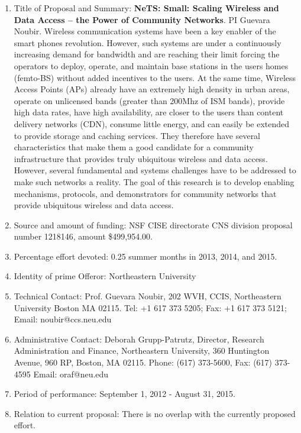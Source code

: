 \begin{enumerate}
\item Title of Proposal and Summary: {\bf NeTS: Small: Scaling Wireless
  and Data Access – the Power of Community Networks}.  PI Guevara
  Noubir.  Wireless communication systems have been a key enabler of
  the smart phones revolution. However, such systems are under a
  continuously increasing demand for bandwidth and are reaching their
  limit forcing the operators to deploy, operate, and maintain base
  stations in the users homes (femto-BS) without added incentives to
  the users. At the same time, Wireless Access Points (APs) already
  have an extremely high density in urban areas, operate on unlicensed
  bands (greater than 200Mhz of ISM bands), provide high data rates,
  have high availability, are closer to the users than content
  delivery networks (CDN), consume little energy, and can easily be
  extended to provide storage and caching services. They therefore
  have several characteristics that make them a good candidate for a
  community infrastructure that provides truly ubiquitous wireless and
  data access. However, several fundamental and systems challenges
  have to be addressed to make such networks a reality.  The goal of
  this research is to develop enabling mechanisms, protocols, and
  demonstrators for community networks that provide ubiquitous
  wireless and data access.
\item Source and amount of funding: NSF CISE directorate CNS division
  proposal number 1218146, amount \$499,954.00.
\item Percentage effort devoted: 0.25 summer months in 2013, 2014, and 2015.
\item Identity of prime Offeror: Northeastern University
\item Technical Contact: Prof. Guevara Noubir,  202 WVH, CCIS, Northeastern University
Boston MA 02115.  Tel: +1 617 373 5205;  Fax: +1 617 373 5121;  Email: noubir@ccs.neu.edu
\item Administrative Contact: Deborah Grupp-Patrutz, Director,
  Research Administration and Finance, Northeastern University, 360
  Huntington Avenue, 960 RP, Boston, MA 02115. Phone: (617) 373-5600,
  Fax: (617) 373-4595 Email: oraf@neu.edu
\item  Period of performance: September 1, 2012 - August 31, 2015.
\item Relation to current proposal: There is no overlap with the currently proposed effort.
\end{enumerate}

